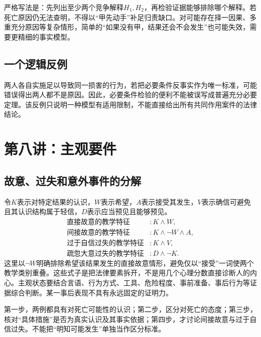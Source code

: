 严格写法是：先列出至少两个竞争解释$H_1,H_2$，再检验证据能够排除哪个解释。若死亡原因仍无法查明，不得以“甲先动手”补足归责缺口。对可能存在择一因果、多重充分原因等复杂情形，简单的“如果没有甲，结果还会不会发生”也可能失效，需要更精细的事实模型。

\subsection{一个逻辑反例}
两人各自实施足以导致同一损害的行为，若把必要条件反事实作为唯一标准，可能错误得出两人都不是原因。因此，必要条件检验的便利不能被误写成普遍充分必要定理。该反例只说明一种模型有适用限制，不能直接给出所有共同作用案件的法律结论。


\section{第八讲：主观要件}
\subsection{故意、过失和意外事件的分解}

令$K$表示对特定结果的认识，$W$表示希望，$A$表示接受其发生，$V$表示确信可避免且其认识结构属于轻信，$D$表示应当预见且能够预见。
\begin{align*}
 \text{直接故意的教学特征}&: K\wedge W,\\
 \text{间接故意的教学特征}&: K\wedge\neg W\wedge A,\\
 \text{过于自信过失的教学特征}&: K\wedge V,\\
 \text{疏忽大意过失的教学特征}&: D\wedge\neg K.
\end{align*}
这里以$\neg W$明确排除希望该结果发生的直接故意情形，避免仅以“接受”一词使两个教学类别重叠。这些式子是把法律要素拆开，不是用几个心理分数直接诊断人的内心。主观状态要结合言语、行为方式、工具、危险程度、事前准备、事后行为等证据综合判断。某一事后表现不具有永远固定的证明力。

第一步，两例都具有对死亡可能性的认识；第二步，区分对死亡的态度；第三步，核对“具体措施”是否为真实认识及其事实依据；第四步，才讨论间接故意与过于自信过失。不能把“明知可能发生”单独当作区分标准。

